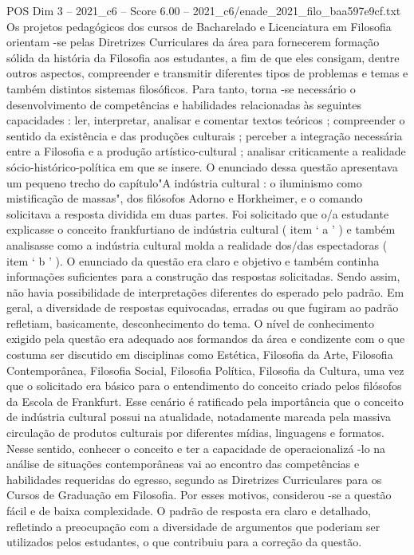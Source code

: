 \begin{textsample}{POS Dim 3 – 2021\_c6 – Score 6.00 – 2021\_c6/enade\_2021\_filo\_baa597e9cf.txt}
Os projetos pedagógicos dos cursos de Bacharelado e Licenciatura em Filosofia orientam -se pelas Diretrizes Curriculares da área para fornecerem formação sólida da história da Filosofia aos estudantes, a fim de que eles consigam, dentre outros aspectos, compreender e transmitir diferentes tipos de problemas e temas e também distintos sistemas filosóficos.
Para tanto, torna -se necessário o desenvolvimento de competências e habilidades relacionadas às seguintes capacidades : ler, interpretar, analisar e comentar textos teóricos ; compreender o sentido da existência e das produções culturais ; perceber a integração necessária entre a Filosofia e a produção artístico-cultural ; analisar criticamente a realidade sócio-histórico-política em que se insere.
O enunciado dessa questão apresentava um pequeno trecho do capítulo"A indústria cultural : o iluminismo como mistificação de massas", dos filósofos Adorno e Horkheimer, e o comando solicitava a resposta dividida em duas partes.
Foi solicitado que o/a estudante explicasse o conceito frankfurtiano de indústria cultural ( item ‘ a ’ ) e também analisasse como a indústria cultural molda a realidade dos/das espectadoras ( item ‘ b ’ ).
O enunciado da questão era claro e objetivo e também continha informações suficientes para a construção das respostas solicitadas.
Sendo assim, não havia possibilidade de interpretações diferentes do esperado pelo padrão.
Em geral, a diversidade de respostas equivocadas, erradas ou que fugiram ao padrão refletiam, basicamente, desconhecimento do tema.
O nível de conhecimento exigido pela questão era adequado aos formandos da área e condizente com o que costuma ser discutido em disciplinas como Estética, Filosofia da Arte, Filosofia Contemporânea, Filosofia Social, Filosofia Política, Filosofia da Cultura, uma vez que o solicitado era básico para o entendimento do conceito criado pelos filósofos da Escola de Frankfurt.
Esse cenário é ratificado pela importância que o conceito de indústria cultural possui na atualidade, notadamente marcada pela massiva circulação de produtos culturais por diferentes mídias, linguagens e formatos.
Nesse sentido, conhecer o conceito e ter a capacidade de operacionalizá -lo na análise de situações contemporâneas vai ao encontro das competências e habilidades requeridas do egresso, segundo as Diretrizes Curriculares para os Cursos de Graduação em Filosofia.
Por esses motivos, considerou -se a questão fácil e de baixa complexidade.
O padrão de resposta era claro e detalhado, refletindo a preocupação com a diversidade de argumentos que poderiam ser utilizados pelos estudantes, o que contribuiu para a correção da questão.

\end{textsample}
